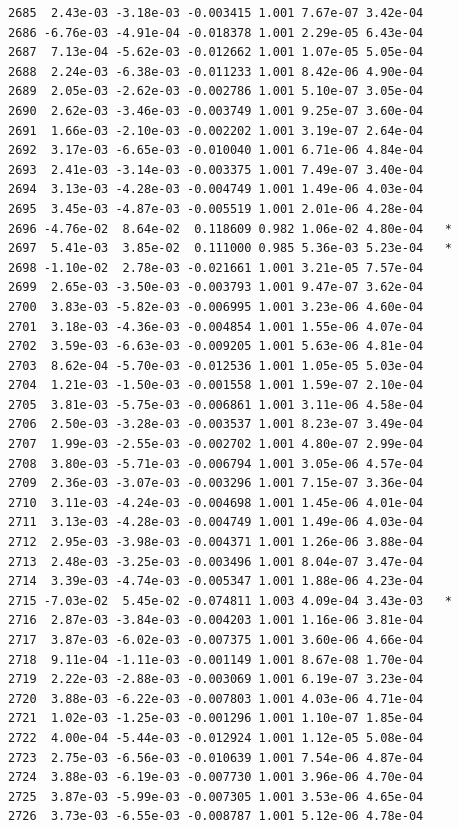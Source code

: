 \documentclass[
  letterpaper,
  DIV=11,
  numbers=noendperiod]{scrartcl}
\begin{document}
\begin{verbatim}
2685  2.43e-03 -3.18e-03 -0.003415 1.001 7.67e-07 3.42e-04    
2686 -6.76e-03 -4.91e-04 -0.018378 1.001 2.29e-05 6.43e-04    
2687  7.13e-04 -5.62e-03 -0.012662 1.001 1.07e-05 5.05e-04    
2688  2.24e-03 -6.38e-03 -0.011233 1.001 8.42e-06 4.90e-04    
2689  2.05e-03 -2.62e-03 -0.002786 1.001 5.10e-07 3.05e-04    
2690  2.62e-03 -3.46e-03 -0.003749 1.001 9.25e-07 3.60e-04    
2691  1.66e-03 -2.10e-03 -0.002202 1.001 3.19e-07 2.64e-04    
2692  3.17e-03 -6.65e-03 -0.010040 1.001 6.71e-06 4.84e-04    
2693  2.41e-03 -3.14e-03 -0.003375 1.001 7.49e-07 3.40e-04    
2694  3.13e-03 -4.28e-03 -0.004749 1.001 1.49e-06 4.03e-04    
2695  3.45e-03 -4.87e-03 -0.005519 1.001 2.01e-06 4.28e-04    
2696 -4.76e-02  8.64e-02  0.118609 0.982 1.06e-02 4.80e-04   *
2697  5.41e-03  3.85e-02  0.111000 0.985 5.36e-03 5.23e-04   *
2698 -1.10e-02  2.78e-03 -0.021661 1.001 3.21e-05 7.57e-04    
2699  2.65e-03 -3.50e-03 -0.003793 1.001 9.47e-07 3.62e-04    
2700  3.83e-03 -5.82e-03 -0.006995 1.001 3.23e-06 4.60e-04    
2701  3.18e-03 -4.36e-03 -0.004854 1.001 1.55e-06 4.07e-04    
2702  3.59e-03 -6.63e-03 -0.009205 1.001 5.63e-06 4.81e-04    
2703  8.62e-04 -5.70e-03 -0.012536 1.001 1.05e-05 5.03e-04    
2704  1.21e-03 -1.50e-03 -0.001558 1.001 1.59e-07 2.10e-04    
2705  3.81e-03 -5.75e-03 -0.006861 1.001 3.11e-06 4.58e-04    
2706  2.50e-03 -3.28e-03 -0.003537 1.001 8.23e-07 3.49e-04    
2707  1.99e-03 -2.55e-03 -0.002702 1.001 4.80e-07 2.99e-04    
2708  3.80e-03 -5.71e-03 -0.006794 1.001 3.05e-06 4.57e-04    
2709  2.36e-03 -3.07e-03 -0.003296 1.001 7.15e-07 3.36e-04    
2710  3.11e-03 -4.24e-03 -0.004698 1.001 1.45e-06 4.01e-04    
2711  3.13e-03 -4.28e-03 -0.004749 1.001 1.49e-06 4.03e-04    
2712  2.95e-03 -3.98e-03 -0.004371 1.001 1.26e-06 3.88e-04    
2713  2.48e-03 -3.25e-03 -0.003496 1.001 8.04e-07 3.47e-04    
2714  3.39e-03 -4.74e-03 -0.005347 1.001 1.88e-06 4.23e-04    
2715 -7.03e-02  5.45e-02 -0.074811 1.003 4.09e-04 3.43e-03   *
2716  2.87e-03 -3.84e-03 -0.004203 1.001 1.16e-06 3.81e-04    
2717  3.87e-03 -6.02e-03 -0.007375 1.001 3.60e-06 4.66e-04    
2718  9.11e-04 -1.11e-03 -0.001149 1.001 8.67e-08 1.70e-04    
2719  2.22e-03 -2.88e-03 -0.003069 1.001 6.19e-07 3.23e-04    
2720  3.88e-03 -6.22e-03 -0.007803 1.001 4.03e-06 4.71e-04    
2721  1.02e-03 -1.25e-03 -0.001296 1.001 1.10e-07 1.85e-04    
2722  4.00e-04 -5.44e-03 -0.012924 1.001 1.12e-05 5.08e-04    
2723  2.75e-03 -6.56e-03 -0.010639 1.001 7.54e-06 4.87e-04    
2724  3.88e-03 -6.19e-03 -0.007730 1.001 3.96e-06 4.70e-04    
2725  3.87e-03 -5.99e-03 -0.007305 1.001 3.53e-06 4.65e-04    
2726  3.73e-03 -6.55e-03 -0.008787 1.001 5.12e-06 4.78e-04    

\end{verbatim}
\end{document}

